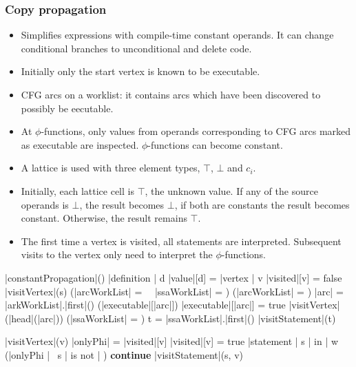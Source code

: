 \documentclass[a4paper,12pt, notitlepage]{article}
\newcommand{\negv}{\vspace{-0.7cm}}
\begin{document}
\subsubsection*{Copy propagation}
\begin{itemize}
\item Simplifies expressions with compile-time constant operands. It can change
conditional branches to unconditional and delete code.
\item Initially only the start vertex is known to be executable.
\item CFG arcs on a worklist: it contains arcs which have been discovered to
possibly be eecutable.
\item At $\phi$-functions, only values from operands corresponding to CFG arcs
marked as executable are inspected. $\phi$-functions can become constant.
\item A lattice is used with three element types, $\top$, $\bot$ and $c_i$.
\item Initially, each lattice cell is $\top$, the unknown value.
If any of the source operands is $\bot$, the result becomes $\bot$, if both are
constants the result becomes constant. Otherwise, the result remains $\top$.
\item The first time a vertex is visited, all statements are interpreted.
Subsequent visits to the vertex only need to interpret the $\phi$-functions.
\end{itemize}

\negv
\begin{program}
\PROC |constantPropagation|() \BODY
    \FOREACH |definition | d \DO
        |value|[d] = \top
    \OD
    \FOREACH |vertex | v \DO
        |visited|[v] = false
    \OD
    |visitVertex|(s)
    \WHILE (|arcWorkList| \not= \emptyset \ \lor \ |ssaWorkList| \not= \emptyset) \DO
        \IF (|arcWorkList| \not= \emptyset) \AR*
            |arc| = |arkWorkList|.|first|()
            \IF (\neg |executable|[|arc|]) \AR*
                |executable|[|arc|] = true
                |visitVertex|(|head|(|arc|))
            \FI
        \FI
        \IF (|ssaWorkList| \not= \emptyset) \AR*
            t = |ssaWorkList|.|first|()
            |visitStatement|(t)
        \FI
    \OD
\end{program}

\negv
\begin{program}
\PROC |visitVertex|(v) \BODY
    |onlyPhi| = |visited|[v]
    |visited|[v] = true
    \FOREACH |statement | s | in | w \DO
        \IF (|onlyPhi | \land \ s | is not | \phi) \AR*
                \textbf{continue}
        \FI
        |visitStatement|(s, v)
    \OD
\end{program}
\end{document}
